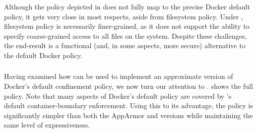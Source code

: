 Although the \bpfbox{} policy depicted in  does not fully
map to the precise Docker default policy, it gets very close in most respects, aside from
filesystem policy. Under \bpfbox{}, filesystem policy is necessarily finer-grained, as it
does not support the ability to specify coarse-grained access to all files on the system.
Despite these challenges, the end-result is a functional (and, in some aspects, more
secure) alternative to the default Docker policy.

\subsubsection{\bpfcontain{}}

Having examined how \bpfbox{} can be used to implement an approximate version of Docker's
default confinement policy, we now turn our attention to \bpfcontain{}.
 shows the full \bpfcontain{} policy. Note that many
aspects of Docker's default policy are covered by \bpfcontain{}'s default
container-boundary enforcement. Using this to its advantage, the \bpfcontain{} policy is
significantly simpler than both the AppArmor and \bpfbox{} versions while maintaining the
same level of expressiveness.

